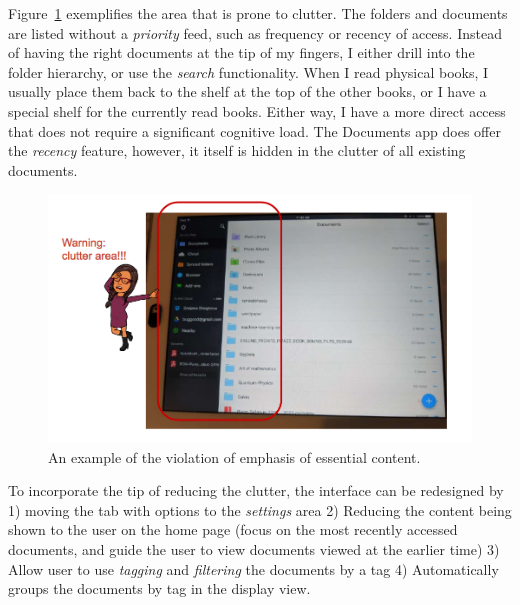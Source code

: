 \documentclass[12pt,letterpaper]{article}
\begin{document}
Figure~\ref{fig::4} exemplifies the area that is prone to clutter. The folders and documents are listed without a \textit{priority} feed, such as frequency or recency of access. Instead of having the right documents at the tip of my fingers, I either drill into the folder hierarchy, or use the \textit{search} functionality. When I read physical books, I usually place them back to the shelf at the top of the other books, or I have a special shelf for the currently read books. Either way, I have a more direct access that does not require a significant cognitive load. The Documents app does offer the \textit{recency} feature, however, it itself is hidden in the clutter of all existing documents.   

\begin{figure}[h]
\centering
\includegraphics[scale=.3]{figures/p2/clutter.png}
\caption{An example of the violation of emphasis of essential content.}
\label{fig::4}
\end{figure}

To incorporate the tip of reducing the clutter, the interface can be redesigned by 1) moving the tab with options to the \textit{settings} area 2) Reducing the content being shown to the user on the home page (focus on the most recently accessed documents, and guide the user to view documents viewed at the earlier time) 3) Allow user to use \textit{tagging} and \textit{filtering} the documents by a tag 4) Automatically groups the documents by tag in the display view.  
\end{document}
